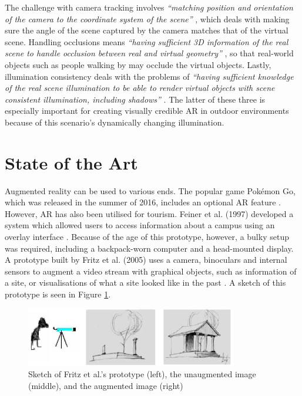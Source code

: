 The challenge with camera tracking involves \textit{“matching position and orientation of the camera to the coordinate system of the scene”} \cite{Lal2010}, which deals with making sure the angle of the scene captured by the camera matches that of the virtual scene. Handling occlusions means \textit{“having sufficient 3D information of the real scene to handle occlusion between real and virtual geometry”} \cite{Lal2010}, so that real-world objects such as people walking by may occlude the virtual objects. Lastly, illumination consistency deals with the problems of \textit{“having sufficient knowledge of the real scene illumination to be able to render virtual objects with scene consistent illumination, including shadows”} \cite{Lal2010}. The latter of these three is especially important for creating visually credible AR in outdoor environments because of this scenario’s dynamically changing illumination.

\section{State of the Art}
Augmented reality can be used to various ends. The popular game Pokémon Go, which was released in the summer of 2016, includes an optional AR feature \cite{Pokemon}. However, AR has also been utilised for tourism. Feiner et al. (1997) developed a system which allowed users to access information about a campus using an overlay interface \cite{Feiner1997}. Because of the age of this prototype, however, a bulky setup was required, including a backpack-worn computer and a head-mounted display. A prototype built by Fritz et al. (2005) uses a camera, binoculars and internal sensors to augment a video stream with graphical objects, such as information of a site, or visualisations of what a site looked like in the past \cite{Fritz2005}. A sketch of this prototype is seen in Figure \ref{fig:binoculars}.

\begin{figure}[h!]
    \centering
    \includegraphics[scale=0.7]{figures/binoc.png}
    \caption{Sketch of Fritz et al.'s prototype (left), the unaugmented image (middle), and the augmented image (right) \cite{Fritz2005}}\label{fig:binoculars}
\end{figure}

